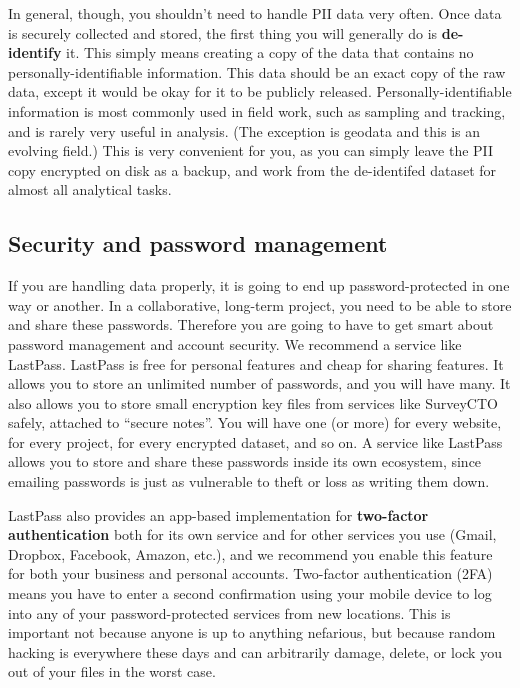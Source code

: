 In general, though, you shouldn't need to handle PII data very often.
Once data is securely collected and stored, the first thing you will generally do is \textbf{de-identify} it.
This simply means creating a copy of the data that contains no personally-identifiable information.
This data should be an exact copy of the raw data,
except it would be okay for it to be publicly released.\cite{matthews2011data}
Personally-identifiable information is most commonly used in field work, such as sampling and tracking,
and is rarely very useful in analysis. (The exception is geodata and this is an evolving field.)
This is very convenient for you, as you can simply leave the PII copy encrypted on disk as a backup,
and work from the de-identifed dataset for almost all analytical tasks.

\subsection{Security and password management}

If you are handling data properly, it is going to end up password-protected in one way or another.
In a collaborative, long-term project, you need to be able to store and share these passwords.
Therefore you are going to have to get smart about password management and account security.
We recommend a service like LastPass.
LastPass is free for personal features and cheap for sharing features.
It allows you to store an unlimited number of passwords, and you will have many.
It also allows you to store small encryption key files from services like SurveyCTO safely, attached to ``secure notes''.
You will have one (or more) for every website, for every project, for every encrypted dataset, and so on.
A service like LastPass allows you to store and share these passwords inside its own ecosystem,
since emailing passwords is just as vulnerable to theft or loss as writing them down.

LastPass also provides an app-based implementation for \textbf{two-factor authentication}
both for its own service and for other services you use (Gmail, Dropbox, Facebook, Amazon, etc.),
and we recommend you enable this feature for both your business and personal accounts.
Two-factor authentication (2FA) means you have to enter a second confirmation using your mobile device
to log into any of your password-protected services from new locations.
This is important not because anyone is up to anything nefarious,
but because random hacking is everywhere these days
and can arbitrarily damage, delete, or lock you out of your files in the worst case.

